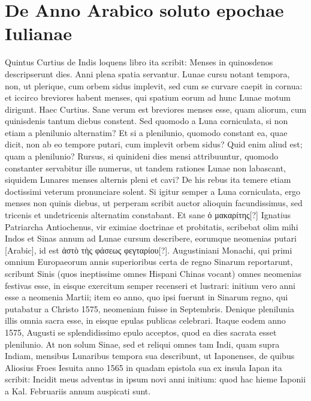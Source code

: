 \section{De Anno Arabico soluto epochae Iulianae}
%
Quintus Curtius de Indis loquens libro  ita scribit: Menses
in quinosdenos descripserunt dies.
Anni plena spatia servantur.
Lunae cursu notant tempora, non, ut plerique, cum orbem
sidus implevit, sed cum se curvare caepit in cornua: et iccirco breviores
habent menses, qui spatium eorum ad hunc Lunae motum dirigunt.
Haec Curtius.
Sane verum est breviores menses esse, quam aliorum,
cum quinisdenis tantum diebus constent.
Sed quomodo a Luna
corniculata, si non etiam a plenilunio alternatim?
Et si a plenilunio,
quomodo constant ea, quae dicit, non ab eo tempore putari, cum implevit
orbem sidus?
Quid enim aliud est; quam a plenilunio?
Rursus,
si quinideni dies mensi attribuuntur, quomodo constanter servabitur
ille numerus, ut tandem rationes Lunae non labascant, siquidem Lunares
menses alternis pleni et cavi?
De his rebus ita temere etiam doctissimi
veterum pronunciare solent.
Si igitur semper a Luna corniculata,
ergo menses non quinis diebus, ut perperam scribit auctor alioquin
facundissimus, sed tricenis et undetricenis alternatim constabant.
Et sane \textgreek{ὁ μακαρίτης[?]} Ignatius Patriarcha Antiochenus,
 vir eximiae
doctrinae et probitatis, scribebat olim mihi Indos et Sinas annum ad
Lunae cursum describere, eorumque neomenias putari \textarabic{[Arabic]},
id est \textgreek{ἀστὸ τὴς φάσεως φεγταρίου[?]}.
Augustiniani Monachi, qui primi
omnium Europaeorum annis superioribus certa de regno Sinarum
reportarunt, scribunt Sinis (quos ineptissime omnes Hispani Chinas
vocant) omnes neomenias festivas esse, in eisque exercitum semper
recenseri et lustrari: initium vero anni esse a neomenia Martii;
item eo anno, quo ipsi fuerunt in Sinarum regno, qui putabatur a
Christo 1575, neomeniam fuisse in  Septembris.
Denique plenilunia
illis omnia sacra esse, in eisque epulas publicas celebrari.
Itaque
eodem anno 1575,  Augusti se splendidissimo epulo acceptos,
quod ea dies sacrata esset plenilunio.
At non solum Sinae, sed et reliqui
omnes tam Indi, quam supra Indiam, mensibus Lunaribus tempora
sua describunt, ut Iaponenses, de quibus Aliosius Froes Iesuita
anno 1565 in quadam epistola sua ex insula Iapan ita scribit: Incidit
meus adventus in ipsum novi anni initium: quod hac hieme Iaponii
a Kal. %
 Februariis annum auspicati sunt.
